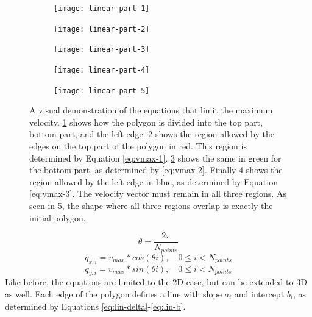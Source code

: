 \begin{figure}[!t]
    \centering
    
    \begin{subfigure}[t]{0.3\textwidth}
        \texttt{[image: linear-part-1]}
        \caption{}
        \label{fig:linear-part-1}
    \end{subfigure}
    \hfil
    \begin{subfigure}[t]{0.3\textwidth}
        \texttt{[image: linear-part-2]}
        \caption{}
        \label{fig:linear-part-2}
    \end{subfigure}
    \hfil    
    \begin{subfigure}[t]{0.3\textwidth}
        \texttt{[image: linear-part-3]}
        \caption{}
        \label{fig:linear-part-3}
    \end{subfigure}
    \hfil    
    \begin{subfigure}[t]{0.3\textwidth}
        \texttt{[image: linear-part-4]}
        \caption{}
        \label{fig:linear-part-4}
    \end{subfigure}
    \hfil    
    \begin{subfigure}[t]{0.3\textwidth}
        \texttt{[image: linear-part-5]}
        \caption{}
        \label{fig:linear-part-5}
    \end{subfigure}
    \caption[A visual demonstration of how the maximum velocity is constrained]{A visual demonstration of the equations that limit the maximum velocity. \ref{fig:linear-part-1} shows how the polygon is divided into the top part, bottom part, and the left edge. \ref{fig:linear-part-2} shows the region allowed by the edges on the top part of the polygon in red. This region is determined by Equation \ref{eq:vmax-1}. \ref{fig:linear-part-3} shows the same in green for the bottom part, as determined by \ref{eq:vmax-2}. Finally  \ref{fig:linear-part-4} shows the region allowed by the left edge in blue, as determined by Equation \ref{eq:vmax-3}. The velocity vector must remain in all three regions. As seen in \ref{fig:linear-part-5}, the shape where all three regions overlap is exactly the initial polygon. }\label{fig:linear-demo}
\end{figure}



\begin{equation}
\label{eq:maxvel-theta}
\theta = \dfrac{2\pi}{N_{points}}
\end{equation}
\begin{equation}
\label{eq:maxvel-points-x}
q_{x,i}  = v_{max} * cos( \theta i), \quad 0 \leq i < N_{points}
\end{equation}
\begin{equation}
\label{eq:maxvel-points-y}
q_{y,i}  = v_{max} * sin( \theta i), \quad 0 \leq i < N_{points}
\end{equation}
Like before, the equations are limited to the 2D case, but can be extended to 3D as well. Each edge of the polygon defines a line with slope $a_i$ and intercept $b_i$, as determined by Equations \ref{eq:lin-delta}-\ref{eq:lin-b}.

